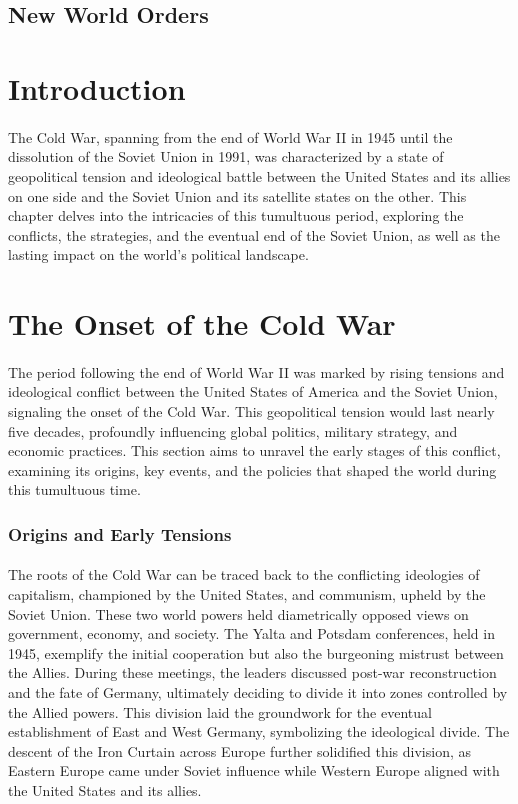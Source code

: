 \documentclass{book}
\begin{document}
\subsection*{New World Orders}

\section*{Introduction}
\paragraph{}
The Cold War, spanning from the end of World War II in 1945 until the dissolution of the Soviet Union in 1991, was characterized by a state of geopolitical tension and ideological battle between the United States and its allies on one side and the Soviet Union and its satellite states on the other. This chapter delves into the intricacies of this tumultuous period, exploring the conflicts, the strategies, and the eventual end of the Soviet Union, as well as the lasting impact on the world’s political landscape.

\section*{The Onset of the Cold War}
\paragraph{}
The period following the end of World War II was marked by rising tensions and ideological conflict between the United States of America and the Soviet Union, signaling the onset of the Cold War. This geopolitical tension would last nearly five decades, profoundly influencing global politics, military strategy, and economic practices. This section aims to unravel the early stages of this conflict, examining its origins, key events, and the policies that shaped the world during this tumultuous time.

\subsubsection*{Origins and Early Tensions}
\paragraph{}
The roots of the Cold War can be traced back to the conflicting ideologies of capitalism, championed by the United States, and communism, upheld by the Soviet Union. These two world powers held diametrically opposed views on government, economy, and society. The Yalta and Potsdam conferences, held in 1945, exemplify the initial cooperation but also the burgeoning mistrust between the Allies. During these meetings, the leaders discussed post-war reconstruction and the fate of Germany, ultimately deciding to divide it into zones controlled by the Allied powers. This division laid the groundwork for the eventual establishment of East and West Germany, symbolizing the ideological divide. The descent of the Iron Curtain across Europe further solidified this division, as Eastern Europe came under Soviet influence while Western Europe aligned with the United States and its allies. 
\end{document}
